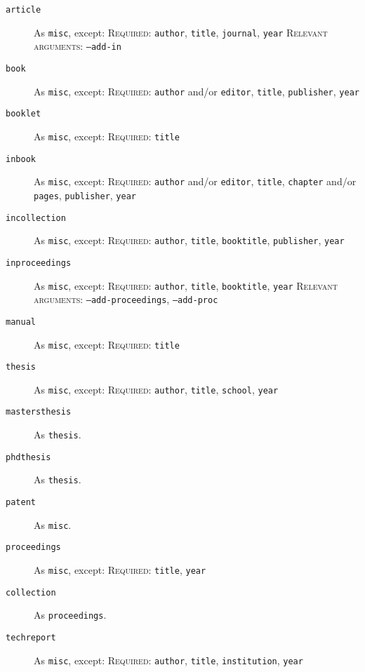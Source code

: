 \documentclass{article}
\begin{document}
\begin{description}
\item[\texttt{article}] As \texttt{misc}, except:
\textsc{Required:} \texttt{author}, \texttt{title}, \texttt{journal}, \texttt{year}
\textsc{Relevant arguments:} \texttt{--add-in}

\item[\texttt{book}] As \texttt{misc}, except:
\textsc{Required:} \texttt{author} and/or \texttt{editor}, \texttt{title}, \texttt{publisher}, \texttt{year}

\item[\texttt{booklet}] As \texttt{misc}, except:
\textsc{Required:} \texttt{title}

\item[\texttt{inbook}] As \texttt{misc}, except:
\textsc{Required:} \texttt{author} and/or \texttt{editor}, \texttt{title}, \texttt{chapter} and/or \texttt{pages}, \texttt{publisher}, \texttt{year}

\item[\texttt{incollection}] As \texttt{misc}, except:
\textsc{Required:} \texttt{author}, \texttt{title}, \texttt{booktitle}, \texttt{publisher}, \texttt{year}

\item[\texttt{inproceedings}] As \texttt{misc}, except:
\textsc{Required:} \texttt{author}, \texttt{title}, \texttt{booktitle}, \texttt{year}
\textsc{Relevant arguments:} \texttt{--add-proceedings}, \texttt{--add-proc}

\item[\texttt{manual}] As \texttt{misc}, except:
\textsc{Required:} \texttt{title}

\item[\texttt{thesis}] As \texttt{misc}, except:
\textsc{Required:} \texttt{author}, \texttt{title}, \texttt{school}, \texttt{year}

\item[\texttt{mastersthesis}] As \texttt{thesis}.

\item[\texttt{phdthesis}] As \texttt{thesis}.

\item[\texttt{patent}] As \texttt{misc}.

\item[\texttt{proceedings}] As \texttt{misc}, except:
\textsc{Required:} \texttt{title}, \texttt{year}

\item[\texttt{collection}] As \texttt{proceedings}.

\item[\texttt{techreport}] As \texttt{misc}, except:
\textsc{Required:} \texttt{author}, \texttt{title}, \texttt{institution}, \texttt{year}


\end{description}
\end{document}
